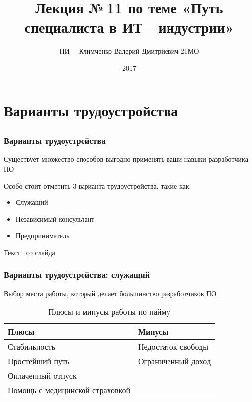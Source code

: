 \documentclass{../industrial-development}
\title{ Лекция №\,11 по теме «Путь специалиста в ИТ---индустрии»}
\author{ПИ--- Климченко Валерий Дмитриевич 21МО }
\date{2017 }
\begin{document}
\begin{frame}
  \titlepage
\end{frame}

\section{Варианты трудоустройства }

\subsection{}

\begin{frame} \frametitle{Варианты трудоустройства}
  \begin{block}{}
  Существует множество способов выгодно применять ваши навыки разработчика ПО 
  \end{block}

  \bigskip
Особо стоит отметить 3 варианта трудоустройства, такие как:
  
  \begin{itemize}
  \item Служащий
  \item Независимый консультант
  \item Предприниматель
  \end{itemize}
\end{frame}

\lecturenotes

Текст~\cite[с.~62--67]{Sonmez} со слайда

\begin{frame} \frametitle{Варианты трудоустройства: служащий}
  \begin{block}{}
    Выбор места работы, который делает большинство разработчиков ПО 
  \end{block}
  
\begin{table}[H]
\caption{\label{tab:canonsummary} Плюсы и минусы работы по найму}
\begin{center}
\begin{tabular}{|l|l|}
\hline
\textbf{Плюсы} & \textbf{Минусы} \\
\hline
Стабильность &  Недостаток свободы \\
\hline
Простейший путь  & Ограниченный доход \\
\hline
Оплаченный отпуск & \\
\hline
Помощь с медицинской страховкой & \\
\hline
\end{tabular}
\end{center}
\end{table} 

\end{frame}
\end{document}
